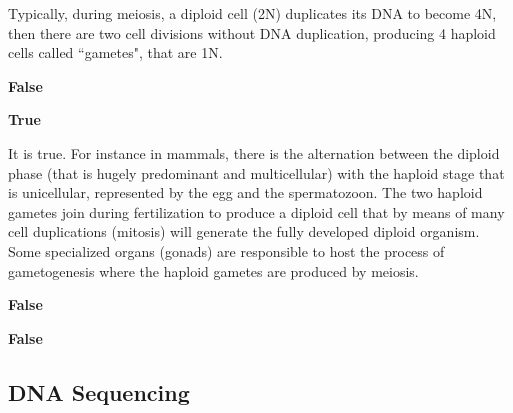 \begin{Answer} [
   ref={ex8},
   number={8}
 ]


Typically, during meiosis,  a diploid cell (2N) duplicates its DNA to become
4N, then there are two cell divisions without DNA duplication, producing 4
haploid cells called “gametes", that are 1N.

\end{Answer}

\begin{Answer} [
   ref={ex9},
   number={9}
 ]

  \Question \textbf{False}

\end{Answer}

\begin{Answer} [
   ref={ex10},
   number={10}
 ]


\end{Answer}

\begin{Answer} [
   ref={ex11},
   number={11}
 ]

  \Question \textbf{True}

It is true. For instance in mammals, there is the alternation between the
diploid phase (that is hugely predominant and multicellular) with the haploid
stage that is unicellular, represented by the egg and the spermatozoon.
The two haploid gametes join during fertilization to produce a diploid cell
that by means of many cell duplications (mitosis) will generate the fully
developed diploid organism.
Some specialized organs (gonads) are responsible to host the process of
gametogenesis where the haploid gametes are produced by meiosis.

\end{Answer}

\begin{Answer} [
   ref={ex12},
   number={12}
 ]

  \Question \textbf{False}

\end{Answer}

\begin{Answer} [
   ref={ex13},
   number={13}
 ]

  \Question \textbf{False}

\end{Answer}

\subsection{DNA Sequencing}

